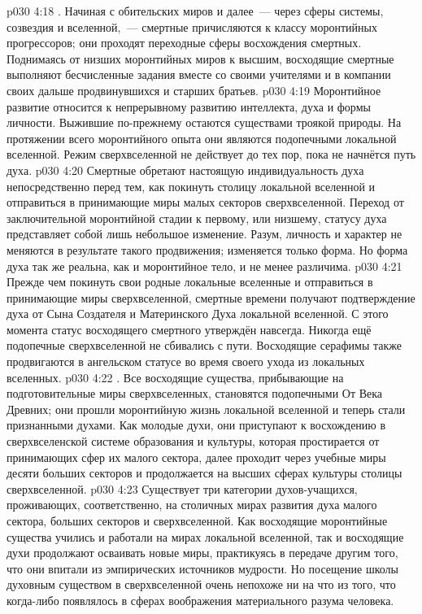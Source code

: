 \vs p030 4:18 . Начиная с обительских миров и далее~--- через сферы системы, созвездия и вселенной,~--- смертные причисляются к классу моронтийных прогрессоров; они проходят переходные сферы восхождения смертных. Поднимаясь от низших моронтийных миров к высшим, восходящие смертные выполняют бесчисленные задания вместе со своими учителями и в компании своих дальше продвинувшихся и старших братьев.
\vs p030 4:19 Моронтийное развитие относится к непрерывному развитию интеллекта, духа и формы личности. Выжившие по\hyp{}прежнему остаются существами троякой природы. На протяжении всего моронтийного опыта они являются подопечными локальной вселенной. Режим сверхвселенной не действует до тех пор, пока не начнётся путь духа.
\vs p030 4:20 Смертные обретают настоящую индивидуальность духа непосредственно перед тем, как покинуть столицу локальной вселенной и отправиться в принимающие миры малых секторов сверхвселенной. Переход от заключительной моронтийной стадии к первому, или низшему, статусу духа представляет собой лишь небольшое изменение. Разум, личность и характер не меняются в результате такого продвижения; изменяется только форма. Но форма духа так же реальна, как и моронтийное тело, и не менее различима.
\vs p030 4:21 Прежде чем покинуть свои родные локальные вселенные и отправиться в принимающие миры сверхвселенной, смертные времени получают подтверждение духа от Сына Создателя и Материнского Духа локальной вселенной. С этого момента статус восходящего смертного утверждён навсегда. Никогда ещё подопечные сверхвселенной не сбивались с пути. Восходящие серафимы также продвигаются в ангельском статусе во время своего ухода из локальных вселенных.
\vs p030 4:22 . Все восходящие существа, прибывающие на подготовительные миры сверхвселенных, становятся подопечными От Века Древних; они прошли моронтийную жизнь локальной вселенной и теперь стали признанными духами. Как молодые духи, они приступают к восхождению в сверхвселенской системе образования и культуры, которая простирается от принимающих сфер их малого сектора, далее проходит через учебные миры десяти больших секторов и продолжается на высших сферах культуры столицы сверхвселенной.
\vs p030 4:23 Существует три категории духов\hyp{}учащихся, проживающих, соответственно, на столичных мирах развития духа малого сектора, больших секторов и сверхвселенной. Как восходящие моронтийные существа учились и работали на мирах локальной вселенной, так и восходящие духи продолжают осваивать новые миры, практикуясь в передаче другим того, что они впитали из эмпирических источников мудрости. Но посещение школы духовным существом в сверхвселенной очень непохоже ни на что из того, что когда\hyp{}либо появлялось в сферах воображения материального разума человека.
